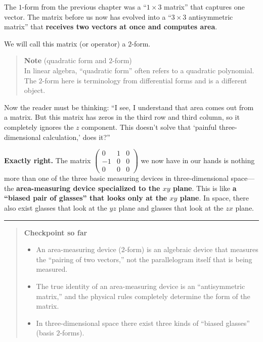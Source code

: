 The \(1\)-form from the previous chapter was a ``\(1 \times 3\) matrix''
that captures one vector. The matrix before us now has evolved into a
``\(3 \times 3\) antisymmetric matrix'' that \textbf{receives two
vectors at once and computes area}.

We will call this matrix (or operator) a \(2\)-form.

\begin{quote}
\textbf{Note} (quadratic form and \(2\)-form)\\
In linear algebra, ``quadratic form'' often refers to a quadratic
polynomial. The \(2\)-form here is terminology from differential forms
and is a different object.
\end{quote}

Now the reader must be thinking: ``I see, I understand that area comes
out from a matrix. But this matrix has zeros in the third row and third
column, so it completely ignores the \(z\) component. This doesn't solve
that `painful three-dimensional calculation,' does it?''

\textbf{Exactly right.} The matrix
\(\begin{pmatrix} 0 & 1 & 0 \\ -1 & 0 & 0 \\ 0 & 0 & 0 \end{pmatrix}\)
we now have in our hands is nothing more than one of the three basic
measuring devices in three-dimensional space---the
\textbf{area-measuring device specialized to the $xy$ plane}. This is
like
\textbf{a “biased pair of glasses” that looks only at the $xy$ plane}.
In space, there also exist glasses that look at the \(yz\) plane and
glasses that look at the \(zx\) plane.

\begin{center}\rule{0.5\linewidth}{0.5pt}\end{center}

\begin{quote}
\textbf{Checkpoint so far}

\begin{itemize}
\item
  An area-measuring device (\(2\)-form) is an algebraic device that
  measures the ``pairing of two vectors,'' not the parallelogram itself
  that is being measured.
\item
  The true identity of an area-measuring device is an ``antisymmetric
  matrix,'' and the physical rules completely determine the form of the
  matrix.
\item
  In three-dimensional space there exist three kinds of ``biased
  glasses'' (basis \(2\)-forms).
\end{itemize}
\end{quote}

